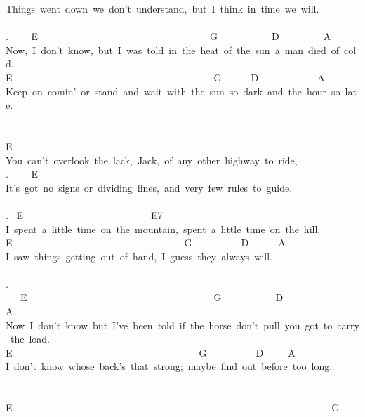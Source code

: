 {Things\ went\ down\ we\ don't\ understand,\ but\ I\ think\ in\ time\ we\ will.\\
\\
. \ \ \ \ E\ \ \ \ \ \ \ \ \ \ \ \ \ \ \ \ \ \ \ \ \ \ \ \ \ \ \ \ \ \ \ \ \ \ \ G\ \ \ \ \ \ \ \ \ \ \ D\ \ \ \ \ \ \ \ \ A\\
Now,\ I\ don't\ know,\ but\ I\ was\ told\ in\ the\ heat\ of\ the\ sun\ a\ man\ died\ of\ cold.\\
E\ \ \ \ \ \ \ \ \ \ \ \ \ \ \ \ \ \ \ \ \ \ \ \ \ \ \ \ \ \ \ \ \ \ \ \ \ \ \ \ \ G\ \ \ \ \ \ D\ \ \ \ \ \ \ \ \ \ \ \ A\\
Keep\ on\ comin'\ or\ stand\ and\ wait\ with\ the\ sun\ so\ dark\ and\ the\ hour\ so\ late.\\
\\
\\
E\\
You\ can't\ overlook\ the\ lack,\ Jack,\ of\ any\ other\ highway\ to\ ride,\\
. \ \ \ \ E\\
It's\ got\ no\ signs\ or\ dividing\ lines,\ and\ very\ few\ rules\ to\ guide.\\
\\
. \ E\ \ \ \ \ \ \ \ \ \ \ \ \ \ \ \ \ \ \ \ \ \ \ \ \ \ E7\\
I\ spent\ a\ little\ time\ on\ the\ mountain,\ spent\ a\ little\ time\ on\ the\ hill,\\
E\ \ \ \ \ \ \ \ \ \ \ \ \ \ \ \ \ \ \ \ \ \ \ \ \ \ \ \ \ \ \ \ \ \ \ G\ \ \ \ \ \ \ \ \ \ D\ \ \ \ \ \ A\\
I\ saw\ things\ getting\ out\ of\ hand,\ I\ guess\ they\ always\ will.\\
\\
. \ \ \ E\ \ \ \ \ \ \ \ \ \ \ \ \ \ \ \ \ \ \ \ \ \ \ \ \ \ \ \ \ \ \ \ \ \ \ \ \ \ G\ \ \ \ \ \ \ \ \ \ \ D\ \ \ \ \ \ \ \ \ \ \ \ \ \ \ A\\
Now\ I\ don't\ know\ but\ I've\ been\ told\ if\ the\ horse\ don't\ pull\ you\ got\ to\ carry\ the\ load.\\
E\ \ \ \ \ \ \ \ \ \ \ \ \ \ \ \ \ \ \ \ \ \ \ \ \ \ \ \ \ \ \ \ \ \ \ \ \ \ G\ \ \ \ \ \ \ \ \ \ D\ \ \ \ \ A\\
I\ don't\ know\ whose\ back's\ that\ strong;\ maybe\ find\ out\ before\ too\ long.\\
\\
\\
E\ \ \ \ \ \ \ \ \ \ \ \ \ \ \ \ \ \ \ \ \ \ \ \ \ \ \ \ \ \ \ \ \ \ \ \ \ \ \ \ \ \ \ \ \ \ \ \ \ \ \ \ \ \ \ \ \ \ \ \ \ \ \ \ \ G\\
}
